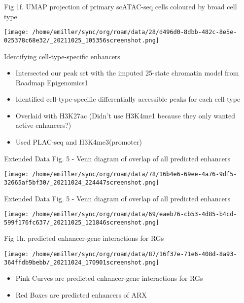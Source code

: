 \documentclass[bigger]{beamer}
\begin{document}
\begin{frame}[label={sec:org3c202ae}]{Fig 1f. UMAP projection of primary scATAC-seq cells coloured by broad cell type}
\begin{center}
\texttt{[image: /home/emiller/sync/org/roam/data/28/d496d0-8dbb-482c-8e5e-025378c68e32/\_20211025\_105356screenshot.png]}
\end{center}
\end{frame}


\begin{frame}[label={sec:orgc42dec2}]{Identifying cell-type-specific enhancers}
\begin{itemize}
\item Intersected our peak set with the imputed 25-state chromatin model from Roadmap Epigenomics1
\item Identified cell-type-specific differentially accessible peaks for each cell
type
\item Overlaid with H3K27ac (Didn't use H3K4me1 because they only wanted active
enhancers?)
\item Used PLAC-seq and H3K4me3(promoter)
\end{itemize}
\end{frame}


\begin{frame}[label={sec:org003052e}]{Extended Data Fig. 5 - Venn diagram of overlap of all predicted enhancers}
\begin{center}
\texttt{[image: /home/emiller/sync/org/roam/data/78/16b4e6-69ee-4a76-9df5-32665af5bf30/\_20211024\_224447screenshot.png]}
\end{center}
\end{frame}

\begin{frame}[label={sec:orgad1c216}]{Extended Data Fig. 5 - Venn diagram of overlap of all predicted enhancers}
\begin{center}
\texttt{[image: /home/emiller/sync/org/roam/data/69/eaeb76-cb53-4d85-b4cd-599f176fc637/\_20211025\_121846screenshot.png]}
\end{center}
\end{frame}

\begin{frame}[label={sec:org149dab6}]{Fig 1h. predicted enhancer-gene interactions for RGs}
\begin{center}
\texttt{[image: /home/emiller/sync/org/roam/data/87/16f37e-71e6-408d-8a93-364ffdb9bebb/\_20211024\_170901screenshot.png]}
\end{center}

\begin{itemize}
\item \alert{Pink Curves} are predicted enhancer-gene interactions for RGs
\item \alert{Red Boxes} are predicted enhancers of ARX
\end{itemize}
\end{frame}
\end{document}
